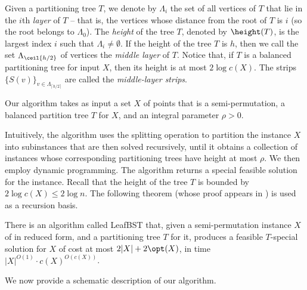 Given a partitioning tree $T$, we denote by $\Lambda_i$ the set of all vertices of $T$ that lie in the $i$th \emph{layer} of $T$ -- that is, the vertices whose distance from the root of $T$ is $i$ (so the root belongs to $\Lambda_0$). The \emph{height} of the tree $T$, denoted by $\height(T)$, is the largest index $i$ such that $\Lambda_i\neq \emptyset$. If the height of the tree $T$ is $h$, then we call the set  $\Lambda_{\ceil{h/2}}$ of vertices the \emph{middle layer} of $T$. Notice that, if $T$ is a balanced partitioning tree for input $X$, then its height is at most $2 \log c(X)$. The strips $\{S(v)\}_{v \in \Lambda_{\lceil h/2 \rceil}}$ are called the \textit{middle-layer strips}. 


Our algorithm takes as input a set $X$ of points that is a semi-permutation, a balanced partition tree $T$ for $X$,  and an integral parameter $\rho>0$. 
%

Intuitively, the algorithm uses the splitting operation to partition the instance $X$ into subinstances that are then solved recursively, until it obtains a collection of instances whose corresponding partitioning trees have height at most $\rho$. We then  employ dynamic programming. 
The algorithm returns a special feasible solution for the instance. 
Recall that the height of the tree $T$ is bounded by $2\log c(X)\leq 2\log n$. 
%
%
The following theorem (whose proof appears in ) is used as a recursion basis. 

\begin{theorem}
	\label{thm: leaf problem1} 
	There is an algorithm called {\sc LeafBST} that, given a semi-permutation instance $X$ of \minsat in reduced form, and a partitioning tree $T$ for it, produces a feasible $T$-special solution for $X$ of cost at most $2 |X| + 2\opt(X)$, in time $|X|^{O(1)} \cdot c(X)^{O(c(X))}$.
\end{theorem}


%
%
%
%


We now provide a schematic description of our algorithm. 
%



%


